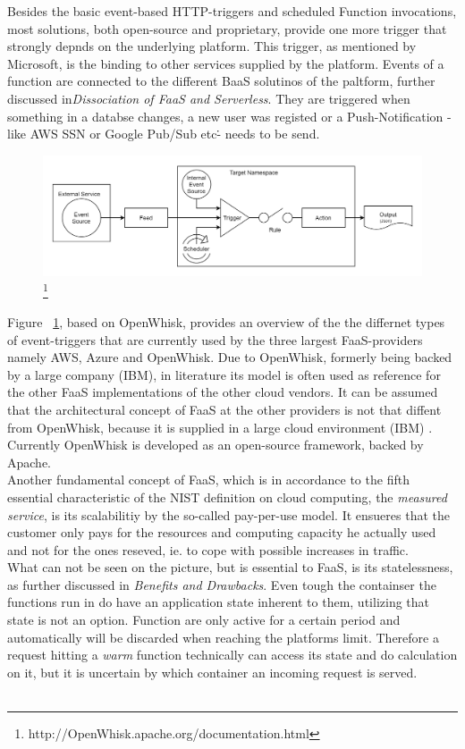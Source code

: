 \documentclass[11pt]{article}
\begin{document}
Besides the basic event-based HTTP-triggers and scheduled Function invocations, most solutions, both open-source and proprietary, provide one more trigger that strongly depnds on the underlying platform. This trigger, as mentioned by Microsoft, is the binding to other services supplied by the platform. Events of a function are connected to the different BaaS solutinos of the paltform, further discussed in\textit{Dissociation of FaaS and Serverless}. They are triggered when something in a databse changes, a new user was registed or a Push-Notification -like AWS SSN or Google Pub/Sub etc\.- needs to be send.\\
\begin{figure}[H]
\caption[FaaS Programming Model nach OpenWhisk]{\footnote{http://OpenWhisk.apache.org/documentation.html}}
\label{fig:OpenWhiskProgrammingModel}
\centering
\includegraphics[width=1\textwidth]{ProgrammingModel}
\end{figure}
Figure ~\ref{fig:OpenWhiskProgrammingModel}, based on OpenWhisk, provides an overview of the the differnet types of event-triggers that are currently used by the three largest FaaS-providers namely AWS, Azure and OpenWhisk. Due to OpenWhisk, formerly being backed by a large company (IBM), in literature its model is often used as reference for the other FaaS implementations of the other cloud vendors. It can be assumed that the architectural concept of FaaS at the other providers is not that diffent from OpenWhisk, because it is supplied in a large cloud environment (IBM) \cite{van2019spec}. Currently OpenWhisk is developed as an open-source framework, backed by Apache. \\ Another fundamental concept of FaaS, which is in accordance to the fifth essential characteristic of the NIST definition on cloud computing, the \textit{measured service}, is its scalabilitiy by the so-called pay-per-use model. It ensueres that the customer only pays for the resources and computing capacity he actually used and not for the ones reseved, ie. to cope with possible increases in traffic.\\ What can not be seen on the picture, but is essential to FaaS, is its statelessness, as further discussed in \textit{Benefits and Drawbacks}. Even tough the containser the functions run in do have an application state inherent to them, utilizing that state is not an option. Function are only active for a certain period and automatically will be discarded when reaching the platforms limit. Therefore a request hitting a \textit{warm} function technically can access its state and do calculation on it, but it is uncertain by which  container an incoming request is served. \\\\
\end{document}
